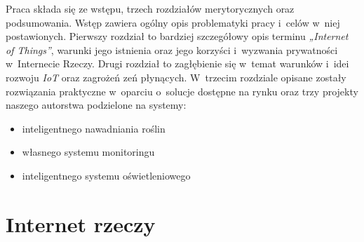 \documentclass{xmgr}
\begin{document}
	Praca składa się ze wstępu, trzech rozdziałów merytorycznych oraz podsumowania. Wstęp zawiera ogólny opis problematyki pracy i~celów w~niej postawionych. Pierwszy rozdział to bardziej szczegółowy opis terminu \emph{„Internet of Things”}, warunki jego istnienia oraz jego korzyści i~wyzwania prywatności w~Internecie Rzeczy. Drugi rozdział to zagłębienie się w~temat warunków i~idei rozwoju \emph{IoT} oraz zagrożeń zeń płynących. W~trzecim rozdziale opisane zostały rozwiązania praktyczne w~oparciu o~solucje dostępne na rynku oraz trzy projekty naszego autorstwa podzielone na systemy:
\begin{itemize}
\item inteligentnego nawadniania roślin
\item własnego systemu monitoringu
\item inteligentnego systemu oświetleniowego
\end{itemize}

\chapter{Internet rzeczy}
\end{document}
